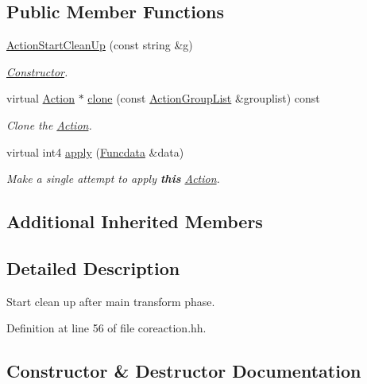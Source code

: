 \subsection*{Public Member Functions}
\begin{DoxyCompactItemize}
\item 
\mbox{\hyperlink{class_action_start_clean_up_a54bd9985580eb352ff524ed08308b77c}{Action\+Start\+Clean\+Up}} (const string \&g)
\begin{DoxyCompactList}\small\item\em \mbox{\hyperlink{class_constructor}{Constructor}}. \end{DoxyCompactList}\item 
virtual \mbox{\hyperlink{class_action}{Action}} $\ast$ \mbox{\hyperlink{class_action_start_clean_up_ad9e7b95a0ee1607e600fad95f78fff93}{clone}} (const \mbox{\hyperlink{class_action_group_list}{Action\+Group\+List}} \&grouplist) const
\begin{DoxyCompactList}\small\item\em Clone the \mbox{\hyperlink{class_action}{Action}}. \end{DoxyCompactList}\item 
virtual int4 \mbox{\hyperlink{class_action_start_clean_up_a169a82db1316093f0e368a34d2df8538}{apply}} (\mbox{\hyperlink{class_funcdata}{Funcdata}} \&data)
\begin{DoxyCompactList}\small\item\em Make a single attempt to apply {\bfseries{this}} \mbox{\hyperlink{class_action}{Action}}. \end{DoxyCompactList}\end{DoxyCompactItemize}
\subsection*{Additional Inherited Members}


\subsection{Detailed Description}
Start clean up after main transform phase. 

Definition at line 56 of file coreaction.\+hh.



\subsection{Constructor \& Destructor Documentation}
\mbox{\label{class_action_start_clean_up_a54bd9985580eb352ff524ed08308b77c}} 
